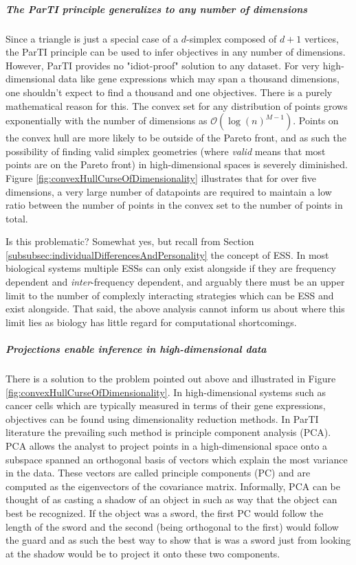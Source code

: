 \subparagraph*{The ParTI principle generalizes to any number of dimensions}
Since a triangle is just a special case of a $d$-simplex composed of $d+1$ vertices, the ParTI principle can be used to infer objectives in any number of dimensions. However, ParTI provides no "idiot-proof" solution to any dataset. For very high-dimensional data like gene expressions which may span a thousand dimensions, one shouldn't expect to find a thousand and one objectives. There is a purely mathematical reason for this. The convex set for any distribution of points grows exponentially with the number of dimensions as $\mathcal{O}(\log{(n)}^{M-1})$. Points on the convex hull are more likely to be outside of the Pareto front, and as such the possibility of finding valid simplex geometries (where \textit{valid} means that most points are on the Pareto front) in high-dimensional spaces is severely diminished. Figure \ref{fig:convexHullCurseOfDimensionality} illustrates that for over five dimensions, a very large number of datapoints are required to maintain a low ratio between the number of points in the convex set to the number of points in total.

Is this problematic? Somewhat yes, but recall from Section \ref{subsubsec:individualDifferencesAndPersonality} the concept of ESS. In most biological systems multiple ESSs can only exist alongside if they are frequency dependent and \textit{inter}-frequency dependent, and arguably there must be an upper limit to the number of complexly interacting strategies which can be ESS and exist alongside. That said, the above analysis cannot inform us about where this limit lies as biology has little regard for computational shortcomings.

\subparagraph*{Projections enable inference in high-dimensional data}
There is a solution to the problem pointed out above and illustrated in Figure \ref{fig:convexHullCurseOfDimensionality}. In high-dimensional systems such as cancer cells which are typically measured in terms of their gene expressions, objectives can be found using dimensionality reduction methods. In ParTI literature the prevailing such method is principle component analysis (PCA). PCA allows the analyst to project points in a high-dimensional space onto a subspace spanned an orthogonal basis of vectors which explain the most variance in the data. These vectors are called principle components (PC) and are computed as the eigenvectors of the covariance matrix. Informally, PCA can be thought of as casting a shadow of an object in such as way that the object can best be recognized. If the object was a sword, the first PC would follow the length of the sword and the second (being orthogonal to the first) would follow the guard and as such the best way to show that is was a sword just from looking at the shadow would be to project it onto these two components.

